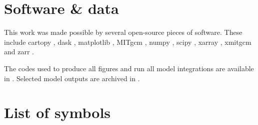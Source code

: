 \chapter*{Software \& data}
This work was made possible by several open-source pieces of software. These include cartopy \citep{Elson2022}, dask \citep{DaskDevelopmentTeam2016, Rocklin2015}, matplotlib \citep{Hunter2007}, MITgcm \citep{MITgcm2022}, numpy \citep{Harris2020}, scipy \citep{Virtanen2020}, xarray \citep{Hoyer2017},  xmitgcm \citep{Abernathey2021} and zarr \citep{Miles2022}.

The codes used to produce all figures and run all model integrations are available in \citet{dwbcV1p1, irmingerV1p0, nbcV1p0, siV1p0}. Selected model outputs are archived in \citet{ThesisData}.

\chapter*{List of symbols}

